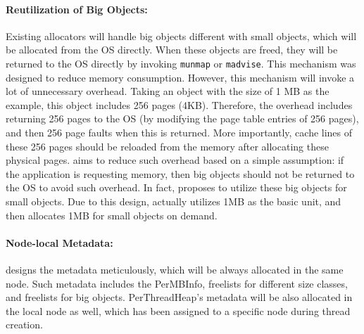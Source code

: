 \paragraph{Reutilization of Big Objects:} Existing allocators will handle big objects different with small objects, which will be allocated from the OS directly. When these objects are freed, they will be returned to the OS directly by invoking \texttt{munmap} or \texttt{madvise}. This mechanism was designed to reduce memory consumption. However, this mechanism will invoke a lot of unnecessary overhead. Taking an object with the size of 1 MB as the example, this object includes 256 pages (4KB). Therefore, the overhead includes returning 256 pages to the OS (by modifying the page table entries of 256 pages), and then 256 page faults when this is returned. More importantly, cache lines of these 256 pages should be reloaded from the memory after allocating these physical pages. \NM{} aims to reduce such overhead based on a simple assumption: if the application is requesting memory, then big objects should not be returned to the OS to avoid such overhead. In fact, \NM{} proposes to utilize these big objects for small objects. Due to this design, \NM{} actually utilizes 1MB as the basic unit, and then allocates 1MB for small objects on demand. 

\paragraph{Node-local Metadata:} \NM{} designs the metadata meticulously, which will be always allocated in the same node. Such metadata includes the PerMBInfo, freelists for different size classes, and freelists for big objects. PerThreadHeap's metadata will be also allocated in the local node as well, which has been assigned to a specific node during thread creation. 


 